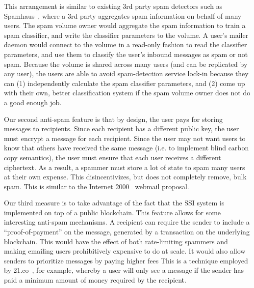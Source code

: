 This arrangement is similar to existing 3rd party spam detectors such as
Spamhaus~\cite{spamhaus}, where a 3rd party aggregates spam information 
on behalf of many users.  The spam volume owner would aggregate the spam
information to train a spam classifier, and write the classifier parameters
to the volume.  A user's mailer daemon would connect to the volume in a read-only fashion
to read the classifier parameters, and use them to classify the user's inbound
messages as spam or not spam.  Because the volume is shared across many users
(and can be replicated by any user), the users are able to avoid spam-detection
service lock-in because they can (1) independently calculate the spam classifier
parameters, and (2) come up with their own, better classification system if the
spam volume owner does not do a good enough job.

Our second anti-spam feature is that by design, the user pays for storing messages to recipients.  Since each
recipient has a different public key, the user must encrypt a message for each
recipient.  Since the user may not want users to know that others have received
the same message (i.e. to implement blind carbon copy semantics), the user must
ensure that each user receives a different ciphertext.  As a result, a spammer
must store a lot of state to spam many users at their own expense.  This
disincentivizes, but does not completely remove, bulk spam.  This is similar to
the Internet 2000~\cite{internet2000} webmail proposal.

Our third measure is to take advantage of the fact that the SSI system is implemented on top of
a public blockchain.  This feature allows for some interesting anti-spam mechanisms.  A recipient can require the sender
to include a ``proof-of-payment'' on the message, generated by a transaction on the
underlying blockchain.  This would have the effect of both rate-limiting
spammers and making emailing users prohibitively expensive to do at scale.  It
would also allow senders to prioritize messages by paying higher fees This
is a technique employed by 21.co~\cite{21co-messaging}, for example, whereby a user will only see a
message if the sender has paid a minimum amount of money required by the
recipient.

